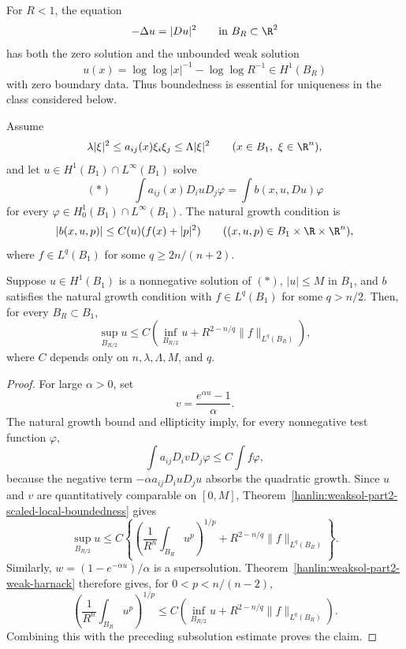 \begin{example}\label{hanlin:weaksol-part2-nonlinear-counterexample}
For $R<1$, the equation
\[
-\Delta u=|Du|^2\qquad\text{in }B_R\subset\R^2
\]
has both the zero solution and the unbounded weak solution
\[
u(x)=\log\log|x|^{-1}-\log\log R^{-1}
\in H^1(B_R)
\]
with zero boundary data. Thus boundedness is essential for uniqueness in the
class considered below.
\end{example}

Assume
\[
\lambda|\xi|^2\leq a_{ij}(x)\xi_i\xi_j\leq\Lambda|\xi|^2
\qquad(x\in B_1,\ \xi\in\R^n),
\]
and let $u\in H^1(B_1)\cap L^\infty(B_1)$ solve
\[
(\ast)\qquad
\int a_{ij}(x)D_i uD_j\varphi
=\int b(x,u,Du)\varphi
\]
for every $\varphi\in H^1_0(B_1)\cap L^\infty(B_1)$. The natural growth
condition is
\[
|b(x,u,p)|\leq C(u)(f(x)+|p|^2)
\qquad((x,u,p)\in B_1\times\R\times\R^n),
\]
where $f\in L^q(B_1)$ for some $q\geq2n/(n+2)$.

\begin{lemma}\label{hanlin:weaksol-part2-nonlinear-harnack}
Suppose $u\in H^1(B_1)$ is a nonnegative solution of $(\ast)$,
$|u|\leq M$ in $B_1$, and $b$ satisfies the natural growth condition with
$f\in L^q(B_1)$ for some $q>n/2$. Then, for every $B_R\subset B_1$,
\[
\sup_{B_{R/2}}u
\leq C\left(\inf_{B_{R/2}}u
+R^{2-n/q}\|f\|_{L^q(B_R)}\right),
\]
where $C$ depends only on $n,\lambda,\Lambda,M$, and $q$.
\end{lemma}
\begin{proof}
\sketch For large $\alpha>0$, set
\[
v=\frac{e^{\alpha u}-1}{\alpha}.
\]
The natural growth bound and ellipticity imply, for every nonnegative test
function $\varphi$,
\begin{equation}
\int a_{ij}D_i vD_j\varphi\leq C\int f\varphi,
\end{equation}
because the negative term
$-\alpha a_{ij}D_i uD_j u$ absorbs the quadratic growth. Since $u$ and $v$
are quantitatively comparable on $[0,M]$,
Theorem~\ref{hanlin:weaksol-part2-scaled-local-boundedness} gives
\begin{equation}
\sup_{B_{R/2}}u
\leq C\left\{
\left(\frac1{R^n}\int_{B_R}u^p\right)^{1/p}
+R^{2-n/q}\|f\|_{L^q(B_R)}\right\}.
\end{equation}
Similarly, $w=(1-e^{-\alpha u})/\alpha$ is a supersolution.
Theorem~\ref{hanlin:weaksol-part2-weak-harnack}
therefore gives, for $0<p<n/(n-2)$,
\[
\left(\frac1{R^n}\int_{B_R}u^p\right)^{1/p}
\leq C\left(
\inf_{B_{R/2}}u+R^{2-n/q}\|f\|_{L^q(B_R)}\right).
\]
Combining this with the preceding subsolution estimate proves the claim.
\end{proof}

